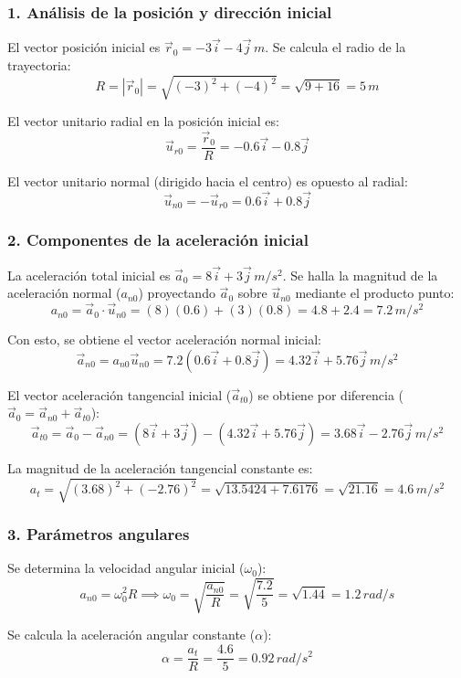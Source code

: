 \documentclass[12pt, a4paper]{article}
\begin{document}
\subsubsection*{1. Análisis de la posición y dirección inicial}
El vector posición inicial es $\vec{r}_0 = -3\vec{i} - 4\vec{j} \, \si{m}$.
Se calcula el radio de la trayectoria:
$$ R = |\vec{r}_0| = \sqrt{(-3)^2 + (-4)^2} = \sqrt{9 + 16} = 5 \, \si{m} $$

El vector unitario radial en la posición inicial es:
$$ \vec{u}_{r0} = \frac{\vec{r}_0}{R} = -0.6\vec{i} - 0.8\vec{j} $$

El vector unitario normal (dirigido hacia el centro) es opuesto al radial:
$$ \vec{u}_{n0} = -\vec{u}_{r0} = 0.6\vec{i} + 0.8\vec{j} $$

\subsubsection*{2. Componentes de la aceleración inicial}
La aceleración total inicial es $\vec{a}_0 = 8\vec{i} + 3\vec{j} \, \si{m/s^2}$.
Se halla la magnitud de la aceleración normal ($a_{n0}$) proyectando $\vec{a}_0$ sobre $\vec{u}_{n0}$ mediante el producto punto:
$$ a_{n0} = \vec{a}_0 \cdot \vec{u}_{n0} = (8)(0.6) + (3)(0.8) = 4.8 + 2.4 = 7.2 \, \si{m/s^2} $$

Con esto, se obtiene el vector aceleración normal inicial:
$$ \vec{a}_{n0} = a_{n0}\vec{u}_{n0} = 7.2(0.6\vec{i} + 0.8\vec{j}) = 4.32\vec{i} + 5.76\vec{j} \, \si{m/s^2} $$

El vector aceleración tangencial inicial ($\vec{a}_{t0}$) se obtiene por diferencia ($\vec{a}_0 = \vec{a}_{n0} + \vec{a}_{t0}$):
$$ \vec{a}_{t0} = \vec{a}_0 - \vec{a}_{n0} = (8\vec{i} + 3\vec{j}) - (4.32\vec{i} + 5.76\vec{j}) = 3.68\vec{i} - 2.76\vec{j} \, \si{m/s^2} $$

La magnitud de la aceleración tangencial constante es:
$$ a_t = \sqrt{(3.68)^2 + (-2.76)^2} = \sqrt{13.5424 + 7.6176} = \sqrt{21.16} = 4.6 \, \si{m/s^2} $$

\subsubsection*{3. Parámetros angulares}
Se determina la velocidad angular inicial ($\omega_0$):
$$ a_{n0} = \omega_0^2 R \implies \omega_0 = \sqrt{\frac{a_{n0}}{R}} = \sqrt{\frac{7.2}{5}} = \sqrt{1.44} = 1.2 \, \si{rad/s} $$

Se calcula la aceleración angular constante ($\alpha$):
$$ \alpha = \frac{a_t}{R} = \frac{4.6}{5} = 0.92 \, \si{rad/s^2} $$
\end{document}
